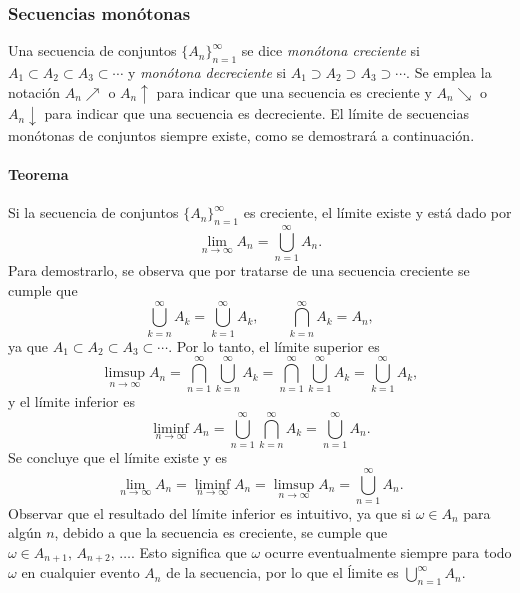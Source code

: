\documentclass[a4paper]{report}
\begin{document}
\subsubsection{Secuencias monótonas}\label{sec:monotone_sequences}

Una secuencia de conjuntos \(\{A_n\}_{n=1}^{\infty}\) se dice \emph{monótona creciente} si \(A_1\subset A_2\subset A_3\subset\cdots\) y \emph{monótona decreciente} si \(A_1\supset A_2\supset A_3\supset\cdots\). Se emplea la notación \(A_n\nearrow\) o \(A_n\uparrow\) para indicar que una secuencia es creciente y \(A_n\searrow\) o \(A_n\downarrow\) para indicar que una secuencia es decreciente. El límite de secuencias monótonas de conjuntos siempre existe, como se demostrará a continuación.

\paragraph{Teorema} Si la secuencia de conjuntos \(\{A_n\}_{n=1}^{\infty}\) es creciente, el límite existe y está dado por
\begin{equation}\label{eq:increasing_sequence_limit}
 \lim_{n\to\infty} A_n = \bigcup_{n=1}^{\infty}A_n.
\end{equation}
Para demostrarlo, se observa que por tratarse de una secuencia creciente se cumple que
\[
 \bigcup_{k=n}^{\infty}A_k=\bigcup_{k=1}^{\infty}A_k,\qquad\bigcap_{k=n}^{\infty}A_k=A_n,
\]
ya que \(A_1\subset A_2\subset A_3\subset\cdots\). Por lo tanto, el límite superior es
\[
 \limsup_{n\rightarrow \infty }A_n=\bigcap_{n=1}^{\infty }\bigcup_{k=n}^{\infty }A_k=\bigcap_{n=1}^{\infty }\bigcup_{k=1}^{\infty}A_k=\bigcup_{k=1}^{\infty}A_k,
\]
y el límite inferior es
 \[
 \liminf_{n\rightarrow \infty }A_n=\bigcup_{n=1}^{\infty }\bigcap_{k=n}^{\infty }A_k=\bigcup_{n=1}^{\infty }A_n.
\]
Se concluye que el límite existe y es
\[
 \lim_{n\to\infty} A_n = \liminf_{n\rightarrow \infty }A_n = \limsup_{n\rightarrow \infty }A_n=\bigcup_{n=1}^{\infty }A_n.
\]
Observar que el resultado del límite inferior es intuitivo, ya que si \(\omega\in A_n\) para algún \(n\), debido a que la secuencia es creciente, se cumple que \(\omega\in A_{n+1},\,A_{n+2},\,\dots\). Esto significa que \(\omega\) ocurre eventualmente siempre para todo \(\omega\) en  cualquier evento \(A_n\) de la secuencia, por lo que el ĺimite es \(\bigcup_{n=1}^{\infty}A_n\).
\end{document}
